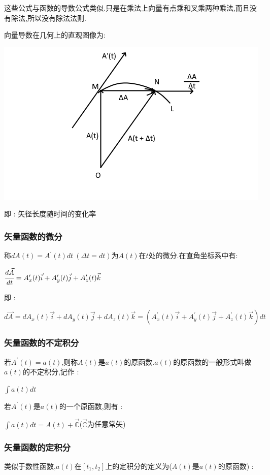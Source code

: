 \documentclass[UTF8,12pt]{ctexbook}
\newcommand{\derivative}{^\prime}
\newcommand{\mathConstant}{\mathbb{C}}
\begin{document}
{{{{{      这些公式与函数的导数公式类似.只是在乘法上向量有点乘和叉乘两种乘法,而且没有除法,所以没有除法法则.

      向量导数在几何上的直观图像为:

      \includegraphics{resources/derivativeOfVectorFunction.png}

      即 : 矢径长度随时间的变化率
    }%

    \subsubsection{矢量函数的微分}{
      称$dA(t) = A\derivative(t)dt\ (\Delta t = dt)$为$A(t)$在$t$处的微分.在直角坐标系中有:

      $\cfrac{d\vec{A}}{dt} = A\derivative_x(t)\vec{i} + A\derivative_y(t)\vec{j} + A\derivative_z(t)\vec{k}$

      即 :

      $d\vec{A} = dA_x(t)\vec{i} + dA_y(t)\vec{j} + dA_z(t)\vec{k} = (A\derivative_x(t)\vec{i} + A\derivative_y(t)\vec{j} + A\derivative_z(t)\vec{k})dt$
    }%

    \subsubsection{矢量函数的不定积分}{
      若$A\derivative(t) = a(t)$,则称$A(t)$是$a(t)$的原函数.$a(t)$的原函数的一般形式叫做$a(t)$的不定积分,记作 :

      $\int a(t)dt$

      若$A\derivative(t)$是$a(t)$的一个原函数,则有 :

      $\int a(t)dt = A(t) + \vec{\mathConstant}$\qquad ($\vec{\mathConstant}$为任意常矢)
    }

    \subsubsection{矢量函数的定积分}{
      类似于数性函数,$a(t)$在$[t_1,t_2]$上的定积分的定义为($A(t)\mbox{是}a(t)$的原函数) :

}}}}}
\end{document}
